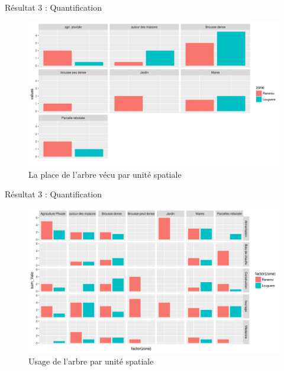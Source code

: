 \documentclass[newPxFont]{beamer}
\begin{document}
\begin{frame}[c]{Résultat 3 : Quantification}
\vspace{-1cm}
\begin{figure}
  \centering
  \includegraphics[width = \textwidth]{img/bar_general}
  \caption{La place de l'arbre vécu par unité spatiale}
\end{figure}

\end{frame}

\begin{frame}[c]{Résultat 3 : Quantification}
\vspace{-1cm}
\begin{figure}
  \centering
  \includegraphics[width = \textwidth]{img/bar_se}
  \caption{Usage de l'arbre par unité spatiale}
\end{figure}

\end{frame}


\end{document}
